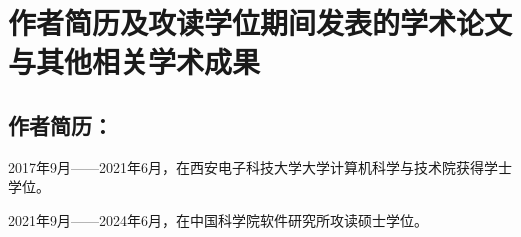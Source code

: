 




\chapter{作者简历及攻读学位期间发表的学术论文与其他相关学术成果}

\section*{作者简历：}
2017年9月——2021年6月，在西安电子科技大学大学计算机科学与技术院获得学士学位。


2021年9月——2024年6月，在中国科学院软件研究所攻读硕士学位。








\cleardoublepage[plain]%
